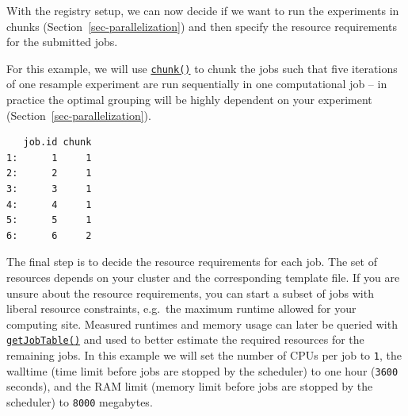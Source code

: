 With the registry setup, we can now decide if we want to run the
experiments in chunks (Section~\ref{sec-parallelization}) and then
specify the resource requirements for the submitted jobs.

For this example, we will use
\href{https://www.rdocumentation.org/packages/batchtools/topics/chunk}{\texttt{chunk()}}
to chunk the jobs such that five iterations of one resample
experiment are run sequentially in one computational job -- in practice
the optimal grouping will be highly dependent on your experiment
(Section~\ref{sec-parallelization}).

\begin{Shaded}
\begin{Highlighting}[]
\OtherTok{=}\SpecialCharTok{$}
\OtherTok{=} \NormalTok{(}
    \NormalTok{, } \NormalTok{)}
\NormalTok{)}
\NormalTok{chunks[}\SpecialCharTok{:}\NormalTok{] }
\end{Highlighting}
\end{Shaded}

\begin{verbatim}
   job.id chunk
1:      1     1
2:      2     1
3:      3     1
4:      4     1
5:      5     1
6:      6     2
\end{verbatim}

The final step is to decide the resource requirements for each job. The
set of resources depends on your cluster and the corresponding template
file. If you are unsure about the resource requirements, you can start a
subset of jobs with liberal resource constraints, e.g.~the maximum
runtime allowed for your computing site. Measured runtimes and memory
usage can later be queried with
\href{https://www.rdocumentation.org/packages/batchtools/topics/getJobTable}{\texttt{getJobTable()}}
and used to better estimate the required resources for the remaining
jobs. In this example we will set the number of CPUs per job to
\texttt{1}, the walltime (time limit before jobs are stopped by the
scheduler) to one hour (\texttt{3600} seconds), and the RAM limit
(memory limit before jobs are stopped by the scheduler) to \texttt{8000}
megabytes.

